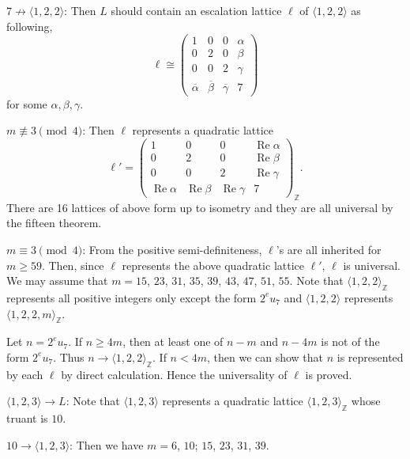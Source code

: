 \documentclass[a4paper,10pt,reqno]{amsart}
\begin{document}
{} $7 \not\to {\langle {1,2,2} \rangle}$: Then $L$ should contain an escalation lattice $\ell$ of
${\langle {1,2,2} \rangle}$ as following,
\[
    \ell \cong
    \begin{pmatrix}
        1 & 0 & 0 & \alpha \\
        0 & 2 & 0 & \beta \\
        0 & 0 & 2 & \gamma \\
        {\overline{{\alpha}}} & {\overline{{\beta}}} & {\overline{{\gamma}}} & 7
    \end{pmatrix}
\]
for some $\alpha, \beta, \gamma$.

{} $m {\not\equiv} 3 \pmod 4$: Then $\ell$ represents a quadratic lattice
\[
    \ell' = \begin{pmatrix}
        1 & 0 & 0 & {\operatorname{Re}}{\alpha} \\
        0 & 2 & 0 & {\operatorname{Re}}{\beta} \\
        0 & 0 & 2 & {\operatorname{Re}}{\gamma} \\
        {\operatorname{Re}}{\alpha} & {\operatorname{Re}}{\beta} & {\operatorname{Re}}{\gamma} & 7
    \end{pmatrix}_{\mathbb{Z}}.
\]
There are 16 lattices of above form up to isometry and they are all universal by the fifteen
theorem.

{} $m \equiv 3 \pmod{4}$: From the positive semi-definiteness, $\ell$'s are all
inherited for $m \ge 59$. Then, since $\ell$ represents the above quadratic lattice  $\ell'$,
$\ell$ is universal. We may assume that $m=15$, $23$, $31$, $35$, $39$, $43$, $47$, $51$, $55$.
Note that ${\langle {1,2,2} \rangle}_{\mathbb{Z}}$ represents all positive integers only except the form $2^{e} u_7$ and
${\langle {1,2,2} \rangle}$ represents ${\langle {1,2,2,m} \rangle}_{\mathbb{Z}}$.

Let $n=2^{e} u_7$. If $n \ge 4m$, then at least one of  $n-m$ and $n-4m$ is not of the form $2^{e}
u_7$. Thus $n \to {\langle {1,2,2} \rangle}_{\mathbb{Z}}$. If $n < 4m$, then we can show that $n$ is represented by each
$\ell$ by direct calculation. Hence the universality of $\ell$ is proved.

{} ${\langle {1,2,3} \rangle} \to L$: Note that ${\langle {1,2,3} \rangle}$ represents a quadratic lattice
${\langle {1,2,3} \rangle}_{\mathbb{Z}}$ whose truant is $10$.

{} $10 \to {\langle {1,2,3} \rangle}$: Then we have $m=6$, $10$; $15$, $23$, $31$, $39$.
\end{document}
